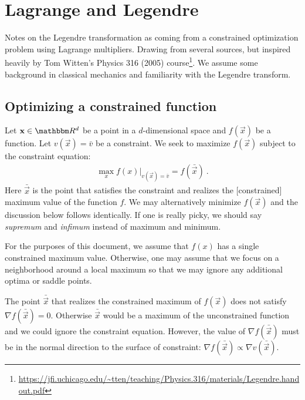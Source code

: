 
\chapter{Lagrange and Legendre}
\label{ch:Lagrange:Legendre}

Notes on the Legendre transformation as coming from a constrained optimization problem using Lagrange multipliers. Drawing from several sources, but inspired heavily by Tom Witten's Physics 316 (2005) course\footnote{\url{https://jfi.uchicago.edu/~tten/teaching/Physics.316/materials/Legendre.handout.pdf}}. We assume some background in classical mechanics and familiarity with the Legendre transform.

\section{Optimizing a constrained function}

Let $\vec{x} \in \RR^d$ be a point in a $d$-dimensional space and $f(\vec{x})$ be a function. Let $v(\vec{x}) = \bar v$ be a constraint. 
We seek to maximize $f(\vec{x})$ subject to the constraint equation:
\begin{align}
 \max_x \left.f(x)\right|_{v(\vec{x})=\bar v} = f(\bar{\vec{x}})    
 \label{eq:constrained:optimization}
 \ .
\end{align}
Here $\bar{\vec{x}}$ is the point that satisfies the constraint and realizes the [constrained] maximum value of the function $f$.
% 
We may alternatively minimize $f(\vec{x})$ and the discussion below follows identically. If one is really picky, we should say  \emph{supremum} and \emph{infimum} instead of maximum and minimum. 

For the purposes of this document, we assume that $f(x)$ has a single constrained maximum value. Otherwise, one may assume that we focus on a neighborhood around a local maximum so that we may ignore any additional optima or saddle points.


The point $\bar{\vec{x}}$ that realizes the constrained maximum of $f(\vec{x})$ does not satisfy $\nabla f(\bar{\vec{x}}) = 0$. Otherwise $\bar{\vec{x}}$ would be a maximum of the unconstrained function and we could ignore the constraint equation. However, the value of $\nabla f(\bar{\vec{x}})$ must be in the normal direction to the surface of constraint: $\nabla f(\bar{\vec{x}}) \propto \nabla v(\bar{\vec{x}})$.

